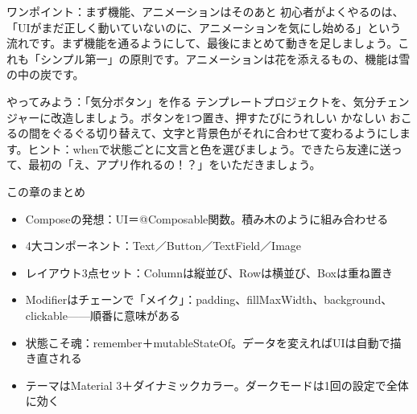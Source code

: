 \begin{tcbinfo}{ワンポイント：まず機能、アニメーションはそのあと}
初心者がよくやるのは、「UIがまだ正しく動いていないのに、アニメーションを気にし始める」という流れです。まず機能を通るようにして、最後にまとめて動きを足しましょう。これも「シンプル第一」の原則です。アニメーションは花を添えるもの、機能は雪の中の炭です。

\end{tcbinfo}

\begin{tcbpractice}{やってみよう：「気分ボタン」を作る}
テンプレートプロジェクトを、気分チェンジャーに改造しましょう。ボタンを1つ置き、押すたびにうれしい かなしい おこるの間をぐるぐる切り替えて、文字と背景色がそれに合わせて変わるようにします。ヒント：whenで状態ごとに文言と色を選びましょう。できたら友達に送って、最初の「え、アプリ作れるの！？」をいただきましょう。

\end{tcbpractice}

\begin{tcbsummary}{この章のまとめ}
\begin{itemize}
  \item Composeの発想：UI＝@Composable関数。積み木のように組み合わせる
  \item 4大コンポーネント：Text／Button／TextField／Image
  \item レイアウト3点セット：Columnは縦並び、Rowは横並び、Boxは重ね置き
  \item Modifierはチェーンで「メイク」：padding、fillMaxWidth、background、clickable——順番に意味がある
  \item 状態こそ魂：remember＋mutableStateOf。データを変えればUIは自動で描き直される
  \item テーマはMaterial 3＋ダイナミックカラー。ダークモードは1回の設定で全体に効く
\end{itemize}

\end{tcbsummary}
